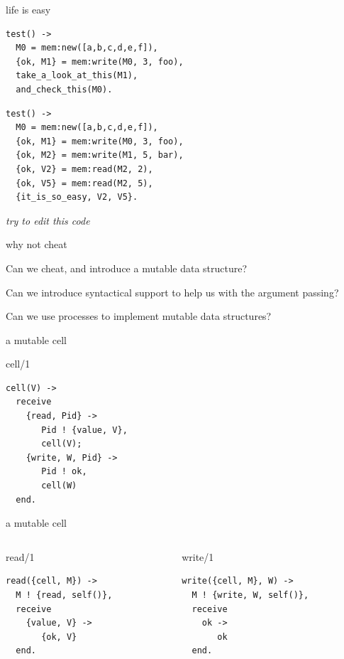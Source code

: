 \begin{frame}[fragile]{life is easy}
\pause
\begin{verbatim}
test() ->
  M0 = mem:new([a,b,c,d,e,f]),
  {ok, M1} = mem:write(M0, 3, foo),
  take_a_look_at_this(M1),
  and_check_this(M0).
\end{verbatim}
\pause
\begin{verbatim}
test() ->
  M0 = mem:new([a,b,c,d,e,f]),
  {ok, M1} = mem:write(M0, 3, foo),
  {ok, M2} = mem:write(M1, 5, bar),
  {ok, V2} = mem:read(M2, 2),
  {ok, V5} = mem:read(M2, 5),
  {it_is_so_easy, V2, V5}.
\end{verbatim}
\pause
{\em try to edit this code}

\end{frame}

\begin{frame}{why not cheat}

Can we cheat, and introduce a mutable data structure?

\pause\vspace{20pt}
Can we introduce syntactical support to help us with the argument passing?

\pause\vspace{20pt}
Can we use processes to implement mutable data structures?

\end{frame}


\begin{frame}[fragile]{a mutable cell}

\begin{block}{cell/1}
 \begin{verbatim}
cell(V) ->
  receive
    {read, Pid} ->
       Pid ! {value, V},
       cell(V);
    {write, W, Pid} ->
       Pid ! ok,
       cell(W)
  end.
 \end{verbatim}
\end{block}
\end{frame}

\begin{frame}[fragile]{a mutable cell}

\begin{columns}
\begin{column}{.5\linewidth}
\begin{block}{read/1}
 \begin{verbatim}
read({cell, M}) ->
  M ! {read, self()},
  receive
    {value, V} ->
       {ok, V}
  end.
 \end{verbatim}
\end{block}
\end{column}
\pause
\begin{column}{.5\linewidth}
\begin{block}{write/1}
 \begin{verbatim}
write({cell, M}, W) ->
  M ! {write, W, self()},
  receive
    ok ->
       ok
  end.
 \end{verbatim}
\end{block}
\end{column}
\end{columns}

\end{frame}

